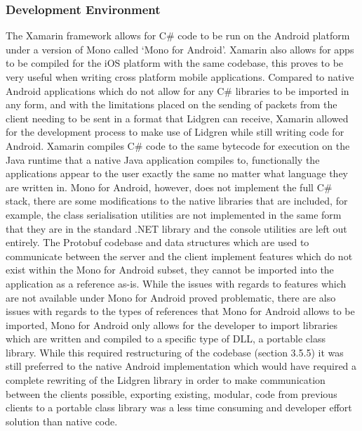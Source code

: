 \documentclass{article}
\begin{document}
\subsubsection{Development Environment}
The Xamarin framework allows for C\# code to be run on the Android platform under a version of Mono called ‘Mono for Android’. Xamarin also allows for apps to be compiled for the iOS platform with the same codebase, this proves to be very useful when writing cross platform mobile applications. Compared to native Android applications which do not allow for any C\# libraries to be imported in any form, and with the limitations placed on the sending of packets from the client needing to be sent in a format that Lidgren can receive, Xamarin allowed for the development process to make use of Lidgren while still writing code for Android. Xamarin compiles C\# code to the same bytecode for execution on the Java runtime that a native Java application compiles to, functionally the applications appear to the user exactly the same no matter what language they are written in. Mono for Android, however, does not implement the full C\# stack, there are some modifications to the native libraries that are included, for example, the class serialisation utilities are not implemented in the same form that they are in the standard .NET library and the console utilities are left out entirely. The Protobuf codebase and data structures which are used to communicate between the server and the client implement features which do not exist within the Mono for Android subset, they cannot be imported into the application as a reference as-is. While the issues with regards to features which are not available under Mono for Android proved problematic, there are also issues with regards to the types of references that Mono for Android allows to be imported, Mono for Android only allows for the developer to import libraries which are written and compiled to a specific type of DLL, a portable class library. While this required restructuring of the codebase (section 3.5.5) it was still preferred to the native Android implementation which would have required a complete rewriting of the Lidgren library in order to make communication between the clients possible, exporting existing, modular, code from previous clients to a portable class library was a less time consuming and developer effort solution than native code.
\end{document}
